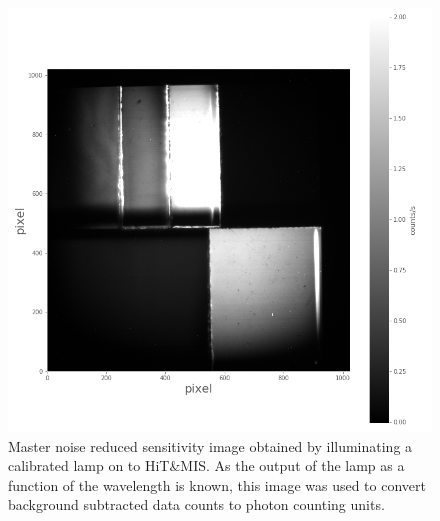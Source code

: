 \documentclass[crop=false,class=mitthesis,oneside,font=12pt]{standalone}
\begin{document}
\begin{figure}[H]
	\centering\includegraphics[width=30pc]{sen.png}
	\caption{Master noise reduced sensitivity image obtained by illuminating a calibrated lamp on to HiT\&MIS. As the output of the lamp as a function of the wavelength is known, this image was used to convert background subtracted data counts to photon counting units. }
	\label{fig:sen}
\end{figure}
\end{document}
